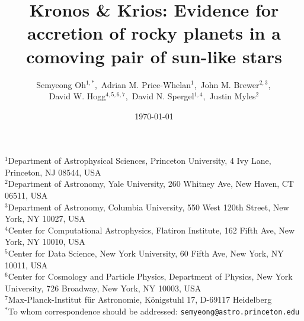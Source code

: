 \documentclass[12pt,letterpaper,margin=1in]{article}
\title{
\vspace{-2cm}
  Kronos \& Krios: Evidence for accretion of rocky planets in a comoving pair of sun-like stars
  \vspace{-0.5cm}
}
\author{
  Semyeong Oh$^{1,*}$,\,
  Adrian M. Price-Whelan$^{1}$,\,
  John M. Brewer$^{2,3}$,\,\\
  David W. Hogg$^{4,5,6,7}$,\,
  David N. Spergel$^{1,4}$,\,
  Justin Myles$^{2}$
}
\date{\small\today}
\begin{document}
\sloppy\sloppypar\raggedbottom\frenchspacing %
\maketitle

\vspace{-1cm}
{\small\noindent
  $^1$Department of Astrophysical Sciences, Princeton University, 4 Ivy Lane, Princeton, NJ 08544, USA \\
  $^2$Department of Astronomy, Yale University, 260 Whitney Ave, New Haven, CT 06511, USA \\
  $^3$Department of Astronomy, Columbia University, 550 West 120th Street, New York, NY 10027, USA \\
  $^4$Center for Computational Astrophysics, Flatiron Institute, 162 Fifth Ave, New York, NY 10010, USA \\
  $^5$Center for Data Science, New York University, 60 Fifth Ave, New York, NY 10011, USA \\
  $^6$Center for Cosmology and Particle Physics, Department of Physics, New York University, 726 Broadway, New York, NY 10003, USA \\
  $^7$Max-Planck-Institut f\"ur Astronomie, K\"onigstuhl 17, D-69117 Heidelberg \\
  $^*$To whom correspondence should be addressed: \texttt{semyeong@astro.princeton.edu}
}





\end{document}
